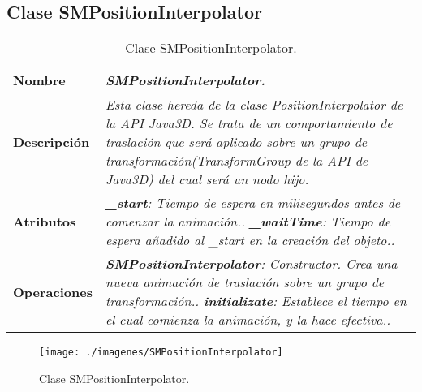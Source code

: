       \subsection{Clase SMPositionInterpolator}
         \begin{table}[!ht] 
            \centering
            \begin{tabular}{|p{4cm}|p{11.5cm}|}
            \hline
            \textbf{Nombre} & \textit{SMPositionInterpolator.}\\ \hline
            \textbf{Descripción} & \textit{Esta clase hereda de la clase PositionInterpolator de la API Java3D. Se trata de un
                                    comportamiento de traslación que será aplicado sobre un grupo de transformación(TransformGroup
                                    de la API de Java3D) del cual será un nodo hijo.}\\ \hline
            \textbf{Atributos} & \textit{\textbf{\_start}: Tiempo de espera en milisegundos antes de comenzar la animación..}\newline
                                 \textit{\textbf{\_waitTime}: Tiempo de espera añadido al \_start en la creación del objeto..}\\ \hline
            \textbf{Operaciones} & \textit{\textbf{SMPositionInterpolator}: Constructor. Crea una nueva animación de traslación sobre un 
                                    grupo de transformación..}\newline
                                    \textit{\textbf{initializate}: Establece el tiempo en el cual comienza la animación, y la hace 
                                    efectiva..}\\ \hline
            \end{tabular}
            \caption{Clase SMPositionInterpolator.}
         \end{table}
         \begin{figure} [H] \begin{center}
            \texttt{[image: ./imagenes/SMPositionInterpolator]}\label{SMPositionInterpolator}
            \caption{Clase SMPositionInterpolator.}
         \end{center} \end{figure}

      
